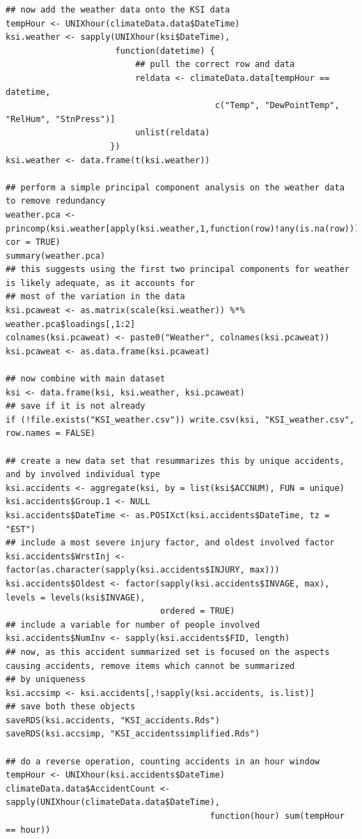 \documentclass{article}
\begin{document}
\begin{lstlisting}
## now add the weather data onto the KSI data
tempHour <- UNIXhour(climateData.data$DateTime)
ksi.weather <- sapply(UNIXhour(ksi$DateTime),
                      function(datetime) {
                          ## pull the correct row and data
                          reldata <- climateData.data[tempHour == datetime,
                                          c("Temp", "DewPointTemp", "RelHum", "StnPress")]
                          unlist(reldata)
                     })
ksi.weather <- data.frame(t(ksi.weather))

## perform a simple principal component analysis on the weather data to remove redundancy
weather.pca <- princomp(ksi.weather[apply(ksi.weather,1,function(row)!any(is.na(row))),], cor = TRUE)
summary(weather.pca)
## this suggests using the first two principal components for weather is likely adequate, as it accounts for
## most of the variation in the data
ksi.pcaweat <- as.matrix(scale(ksi.weather)) %*% weather.pca$loadings[,1:2]
colnames(ksi.pcaweat) <- paste0("Weather", colnames(ksi.pcaweat))
ksi.pcaweat <- as.data.frame(ksi.pcaweat)

## now combine with main dataset
ksi <- data.frame(ksi, ksi.weather, ksi.pcaweat)
## save if it is not already
if (!file.exists("KSI_weather.csv")) write.csv(ksi, "KSI_weather.csv", row.names = FALSE)

## create a new data set that resummarizes this by unique accidents, and by involved individual type
ksi.accidents <- aggregate(ksi, by = list(ksi$ACCNUM), FUN = unique)
ksi.accidents$Group.1 <- NULL
ksi.accidents$DateTime <- as.POSIXct(ksi.accidents$DateTime, tz = "EST")
## include a most severe injury factor, and oldest involved factor
ksi.accidents$WrstInj <- factor(as.character(sapply(ksi.accidents$INJURY, max)))
ksi.accidents$Oldest <- factor(sapply(ksi.accidents$INVAGE, max), levels = levels(ksi$INVAGE),
                               ordered = TRUE)
## include a variable for number of people involved
ksi.accidents$NumInv <- sapply(ksi.accidents$FID, length)
## now, as this accident summarized set is focused on the aspects causing accidents, remove items which cannot be summarized
## by uniqueness
ksi.accsimp <- ksi.accidents[,!sapply(ksi.accidents, is.list)]
## save both these objects
saveRDS(ksi.accidents, "KSI_accidents.Rds")
saveRDS(ksi.accsimp, "KSI_accidentssimplified.Rds")

## do a reverse operation, counting accidents in an hour window
tempHour <- UNIXhour(ksi.accidents$DateTime)
climateData.data$AccidentCount <- sapply(UNIXhour(climateData.data$DateTime),
                                         function(hour) sum(tempHour == hour))



\end{lstlisting}
\end{document}
